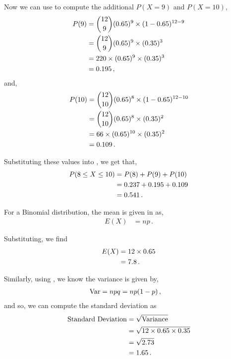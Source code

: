\begin{subquestions}
\begin{subsubquestions}
\begin{subsubsubquestions}
Now we can use  to compute the additional $P(X=9)$ and $P(X=10)$,
\begin{align}
	P(9) & = { 12 \choose 9} (0.65)^9 \times (1-0.65)^{12-9} \nonumber \\
	     & = { 12 \choose 9} (0.65)^9 \times (0.35)^{3} \nonumber \\
	     & = 220 \times (0.65)^9 \times (0.35)^{3} \nonumber \\
	     & = 0.195 \,,
\end{align}
and,
\begin{align}
	P(10) & = { 12 \choose 10} (0.65)^8 \times (1-0.65)^{12-10} \nonumber \\
         & = { 12 \choose 10} (0.65)^8 \times (0.35)^{2} \nonumber \\
	     & = 66 \times (0.65)^{10} \times (0.35)^{2} \nonumber \\
	     & = 0.109 \,.
\end{align}

Substituting these values into , we get that,
\begin{align}
	P(8\leq X \leq 10) & = P(8)+P(9)+P(10) \nonumber \\
	                   & = 0.237+0.195+0.109 \nonumber \\
	                   & = 0.541 \,.   
\end{align}

\end{subsubsubquestions}


\subsubquestion

For a Binomial distribution, the mean is given in  as,
\begin{align}
	E(X) & = np \,.
\end{align}

Substituting, we find
\begin{align}
	E(X) & = 12 \times 0.65 \nonumber \\
	     & = 7.8 \,.
\end{align}

Similarly, using , we know the variance is given by,
\begin{align}
	\text{Var} &= npq = n p (1-p) \,,
\end{align}
and so, we can compute the standard deviation as
\begin{align}
	\text{Standard Deviation} & = \sqrt{\text{Variance}} \nonumber \\
	                          & = \sqrt{12\times0.65\times0.35} \nonumber \\
	                          & = \sqrt{2.73} \nonumber \\
	                          & = 1.65 \,.
\end{align}


\end{subsubquestions}
\end{subquestions}
